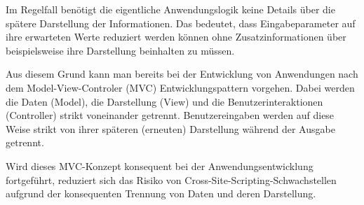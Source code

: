 Im Regelfall benötigt die eigentliche Anwendungslogik keine Details über die spätere Darstellung der Informationen. Das bedeutet, dass Eingabeparameter auf ihre erwarteten Werte reduziert werden können ohne Zusatzinformationen über beispielsweise ihre Darstellung beinhalten zu müssen.

Aus diesem Grund kann man bereits bei der Entwicklung von Anwendungen nach dem Model-View-Controler (MVC) Entwicklungspattern vorgehen. Dabei werden die Daten (Model), die Darstellung (View) und die Benutzerinteraktionen (Controller) strikt voneinander getrennt. Benutzereingaben werden auf diese Weise strikt von ihrer späteren (erneuten) Darstellung während der Ausgabe getrennt.

Wird dieses MVC-Konzept konsequent bei der Anwendungsentwicklung fortgeführt, reduziert sich das Risiko von Cross-Site-Scripting-Schwachstellen aufgrund der konsequenten Trennung von Daten und deren Darstellung.

